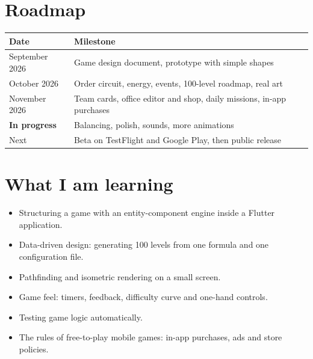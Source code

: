 \documentclass[a4paper,11pt]{article}
\begin{document}
\section{Roadmap}

\begin{table}[H]
\centering
\begin{tabularx}{\textwidth}{@{}lX@{}}
\toprule
\textbf{Date} & \textbf{Milestone} \\
\midrule
September 2026 & Game design document, prototype with simple shapes \\
October 2026 & Order circuit, energy, events, 100-level roadmap, real art \\
November 2026 & Team cards, office editor and shop, daily missions, in-app purchases \\
\textbf{In progress} & Balancing, polish, sounds, more animations \\
Next & Beta on TestFlight and Google Play, then public release \\
\bottomrule
\end{tabularx}
\end{table}

\section{What I am learning}
\begin{itemize}
  \item Structuring a game with an entity-component engine inside a Flutter application.
  \item Data-driven design: generating 100 levels from one formula and one configuration file.
  \item Pathfinding and isometric rendering on a small screen.
  \item Game feel: timers, feedback, difficulty curve and one-hand controls.
  \item Testing game logic automatically.
  \item The rules of free-to-play mobile games: in-app purchases, ads and store policies.
\end{itemize}
\end{document}
